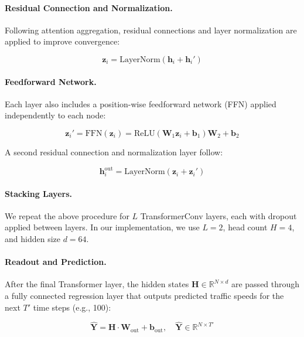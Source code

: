 \documentclass[runningheads]{llncs}
\begin{document}
\paragraph{Residual Connection and Normalization.} Following attention aggregation, residual connections and layer normalization are applied to improve convergence:

\begin{equation}
\mathbf{z}_i = \text{LayerNorm}(\mathbf{h}_i + \mathbf{h}_i')
\end{equation}

\paragraph{Feedforward Network.} Each layer also includes a position-wise feedforward network (FFN) applied independently to each node:

\begin{equation}
\mathbf{z}_i' = \text{FFN}(\mathbf{z}_i) = \text{ReLU}(\mathbf{W}_1 \mathbf{z}_i + \mathbf{b}_1)\mathbf{W}_2 + \mathbf{b}_2
\end{equation}

A second residual connection and normalization layer follow:

\begin{equation}
\mathbf{h}_i^{\text{out}} = \text{LayerNorm}(\mathbf{z}_i + \mathbf{z}_i')
\end{equation}

\paragraph{Stacking Layers.} We repeat the above procedure for $L$ TransformerConv layers, each with dropout applied between layers. In our implementation, we use $L = 2$, head count $H = 4$, and hidden size $d = 64$.

\paragraph{Readout and Prediction.} After the final Transformer layer, the hidden states $\mathbf{H} \in \mathbb{R}^{N \times d}$ are passed through a fully connected regression layer that outputs predicted traffic speeds for the next $T'$ time steps (e.g., 100):

\begin{equation}
\hat{\mathbf{Y}} = \mathbf{H} \cdot \mathbf{W}_{\text{out}} + \mathbf{b}_{\text{out}}, \quad \hat{\mathbf{Y}} \in \mathbb{R}^{N \times T'}
\end{equation}
\end{document}
